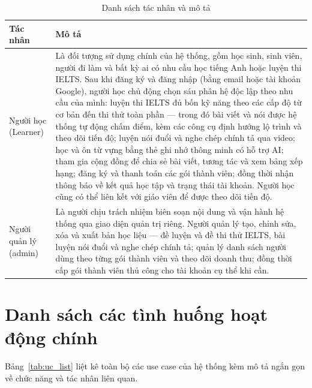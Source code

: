 \begin{table}[H]
    \centering
    \caption{Danh sách tác nhân và mô tả}
    \label{tab:actors}
    \renewcommand{\arraystretch}{1.3}
    \begin{tabularx}{\linewidth}{|l|X|}
        \hline
        \textbf{Tác nhân} & \textbf{Mô tả} \\ \hline
        Người học (Learner) &
        Là đối tượng sử dụng chính của hệ thống, gồm học sinh, sinh viên, người đi làm và bất kỳ ai có nhu cầu học tiếng Anh hoặc luyện thi IELTS. Sau khi đăng ký và đăng nhập (bằng email hoặc tài khoản Google), người học chủ động chọn sáu phân hệ độc lập theo nhu cầu của mình: luyện thi IELTS đủ bốn kỹ năng theo các cấp độ từ cơ bản đến thi thử toàn phần --- trong đó bài viết và nói được hệ thống tự động chấm điểm, kèm các công cụ định hướng lộ trình và theo dõi tiến độ; luyện nói đuổi và nghe chép chính tả qua video; học và ôn từ vựng bằng thẻ ghi nhớ thông minh có hỗ trợ AI; tham gia cộng đồng để chia sẻ bài viết, tương tác và xem bảng xếp hạng; đăng ký và thanh toán các gói thành viên; đồng thời nhận thông báo về kết quả học tập và trạng thái tài khoản. Người học cũng có thể liên kết với giáo viên để được theo dõi tiến độ. \\ \hline
        Người quản lý (admin) &
        Là người chịu trách nhiệm biên soạn nội dung và vận hành hệ thống qua giao diện quản trị riêng. Người quản lý tạo, chỉnh sửa, xóa và xuất bản học liệu --- đề luyện và đề thi thử IELTS, bài luyện nói đuổi và nghe chép chính tả; quản lý danh sách người dùng theo từng gói thành viên và theo dõi doanh thu; đồng thời cấp gói thành viên thủ công cho tài khoản cụ thể khi cần. \\ \hline
    \end{tabularx}
\end{table}


\section{Danh sách các tình huống hoạt động chính}
Bảng~\ref{tab:uc_list} liệt kê toàn bộ các use case của hệ thống kèm mô tả ngắn gọn về chức năng và tác nhân liên quan.

